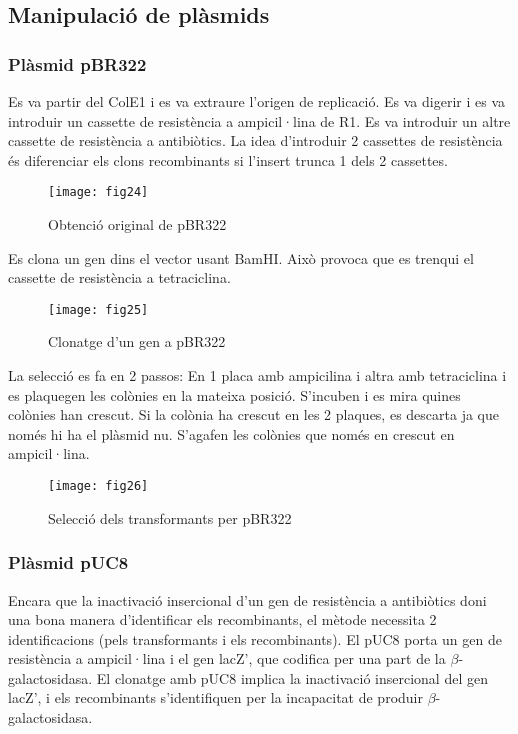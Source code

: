 \subsection{Manipulació de plàsmids}
\label{sec:manip-de-plasm}

\subsubsection{Plàsmid pBR322}
\label{sec:constr-del-plasm}

Es va partir del ColE1 i es va extraure l'origen de replicació. Es va
digerir i es va introduir un cassette de resistència a ampicil·lina
de R1. Es va introduir un altre cassette de resistència a
antibiòtics. La idea d'introduir 2 cassettes de resistència és
diferenciar els clons recombinants si l'insert trunca 1 dels 2
cassettes.

\begin{figure}[H]
  \centering
  \texttt{[image: fig24]}
  \caption{Obtenció original de pBR322}
  \label{fig:fig24}
\end{figure}

Es clona un gen dins el vector usant BamHI. Això provoca que es
trenqui el cassette de resistència a tetraciclina.

\begin{figure}[H]
  \centering
  \texttt{[image: fig25]}
  \caption{Clonatge d'un gen a pBR322}
  \label{fig:fig25}
\end{figure}

La selecció es fa en 2 passos: En 1 placa amb ampicilina i altra amb
tetraciclina i es plaquegen les colònies en la mateixa
posició. S'incuben i es mira quines colònies han crescut. Si la
colònia ha crescut en les 2 plaques, es descarta ja que només hi ha el
plàsmid nu. S'agafen les colònies que només en crescut en
ampicil·lina.

\begin{figure}[H]
  \centering
  \texttt{[image: fig26]}
  \caption{Selecció dels transformants per pBR322}
  \label{fig:fig26}
\end{figure}

\subsubsection{Plàsmid pUC8}
\label{sec:plasmid-puc8}
Encara que la inactivació insercional d'un gen de resistència a
antibiòtics doni una bona manera d'identificar els recombinants, el
mètode necessita 2 identificacions (pels transformants i els
recombinants). El pUC8 porta un gen de resistència a ampicil·lina i el
gen lacZ', que codifica per una part de la $\beta$-galactosidasa. El
clonatge amb pUC8 implica la inactivació insercional del gen lacZ', i
els recombinants s'identifiquen per la incapacitat de produir
$\beta$-galactosidasa.

